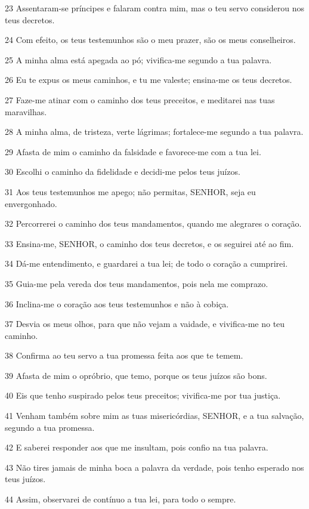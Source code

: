 \par 23 Assentaram-se príncipes e falaram contra mim, mas o teu servo considerou nos teus decretos.
\par 24 Com efeito, os teus testemunhos são o meu prazer, são os meus conselheiros.
\par 25 A minha alma está apegada ao pó; vivifica-me segundo a tua palavra.
\par 26 Eu te expus os meus caminhos, e tu me valeste; ensina-me os teus decretos.
\par 27 Faze-me atinar com o caminho dos teus preceitos, e meditarei nas tuas maravilhas.
\par 28 A minha alma, de tristeza, verte lágrimas; fortalece-me segundo a tua palavra.
\par 29 Afasta de mim o caminho da falsidade e favorece-me com a tua lei.
\par 30 Escolhi o caminho da fidelidade e decidi-me pelos teus juízos.
\par 31 Aos teus testemunhos me apego; não permitas, SENHOR, seja eu envergonhado.
\par 32 Percorrerei o caminho dos teus mandamentos, quando me alegrares o coração.
\par 33 Ensina-me, SENHOR, o caminho dos teus decretos, e os seguirei até ao fim.
\par 34 Dá-me entendimento, e guardarei a tua lei; de todo o coração a cumprirei.
\par 35 Guia-me pela vereda dos teus mandamentos, pois nela me comprazo.
\par 36 Inclina-me o coração aos teus testemunhos e não à cobiça.
\par 37 Desvia os meus olhos, para que não vejam a vaidade, e vivifica-me no teu caminho.
\par 38 Confirma ao teu servo a tua promessa feita aos que te temem.
\par 39 Afasta de mim o opróbrio, que temo, porque os teus juízos são bons.
\par 40 Eis que tenho suspirado pelos teus preceitos; vivifica-me por tua justiça.
\par 41 Venham também sobre mim as tuas misericórdias, SENHOR, e a tua salvação, segundo a tua promessa.
\par 42 E saberei responder aos que me insultam, pois confio na tua palavra.
\par 43 Não tires jamais de minha boca a palavra da verdade, pois tenho esperado nos teus juízos.
\par 44 Assim, observarei de contínuo a tua lei, para todo o sempre.
